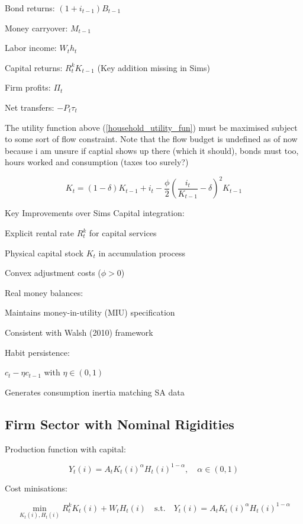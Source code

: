 \documentclass[11pt,preprint]{elsarticle}
\numberwithin{equation}{section}
\numberwithin{figure}{section}
\numberwithin{table}{section}
\begin{document}
Bond returns: \((1 + i_{t-1}) B_{t-1}\)

Money carryover: \(M_{t-1}\)

Labor income: \(W_t h_t\)

Capital returns: \(R_t^k K_{t-1}\) (Key addition missing in Sims)

Firm profits: \(\Pi_t\)

Net transfers: \(-P_t \tau_t\)

The utility function above (\ref{household_utility_fun}) must be
maximised subject to some sort of flow constraint. Note that the flow
budget is undefined as of now because i am unsure if captial shows up
there (which it should), bonds must too, hours worked and consumption
(taxes too surely?)

\begin{equation}
K_t = (1 - \delta) K_{t-1} + i_t - \frac{\phi}{2} \left( \frac{i_t}{K_{t-1}} - \delta \right)^2 K_{t-1}
\end{equation}

Key Improvements over Sims Capital integration:

Explicit rental rate \(R_t^k\) for capital services

Physical capital stock \(K_t\) in accumulation process

Convex adjustment costs (\(\phi > 0\))

Real money balances:

Maintains money-in-utility (MIU) specification

Consistent with Walsh (2010) framework

Habit persistence:

\(c_t - \eta c_{t-1}\) with \(\eta \in (0,1)\)

Generates consumption inertia matching SA data

\subsection{Firm Sector with Nominal
Rigidities}\label{firm-sector-with-nominal-rigidities}

Production function with capital:

\begin{equation}
Y_t(i) = A_t K_t(i)^{\alpha} H_t(i)^{1-\alpha}, \quad \alpha \in (0,1)
\label{production}
\end{equation}

Cost minisations:

\begin{equation}
\min_{K_t(i), H_t(i)} R_t^k K_t(i) + W_t H_t(i) \quad \text{s.t.} \quad Y_t(i) = A_t K_t(i)^{\alpha} H_t(i)^{1-\alpha}
\end{equation}
\end{document}
